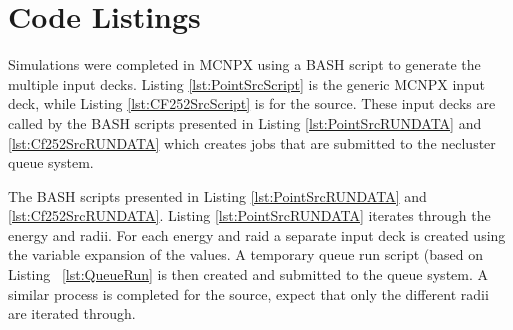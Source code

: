 \section{Code Listings}
Simulations were completed in MCNPX using a BASH script to generate the multiple input decks.
Listing \ref{lst:PointSrcScript} is the generic MCNPX input deck, while Listing \ref{lst:CF252SrcScript} is for the  source.
These input decks are called by the BASH scripts presented in Listing \ref{lst:PointSrcRUNDATA} and \ref{lst:Cf252SrcRUNDATA} which creates
jobs that are submitted to the necluster queue system.





The BASH scripts presented in Listing \ref{lst:PointSrcRUNDATA} and \ref{lst:Cf252SrcRUNDATA}. 
Listing \ref{lst:PointSrcRUNDATA} iterates through the energy and radii.
For each energy and raid a separate input deck is created using the variable expansion of the values. 
A temporary queue run script (based on Listing ~\ref{lst:QueueRun} is then created and submitted to the queue system.
A similar process is completed for the  source, expect that only the different radii are iterated through.



